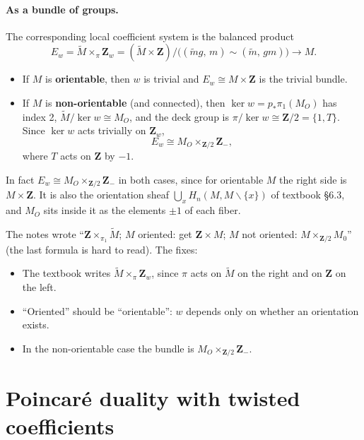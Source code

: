 \documentclass[11pt]{article}
\newcommand{\Z}{\mathbf{Z}}
\newcommand{\MO}{M_O}
\newcommand{\Mt}{\widetilde{M}}
\newcommand{\minus}{\smallsetminus}
\newcommand{\iso}{\cong}
\theoremstyle{namedit}
\theoremstyle{namedrm}
\begin{document}
\paragraph{As a bundle of groups.}
The corresponding local coefficient system is the balanced product
\[
  E_w=\Mt\times_{\pi}\Z_w=(\Mt\times\Z)\big/\bigl((\tilde m g,\,m)\sim(\tilde m,\,g m)\bigr)\longrightarrow M .
\]
\begin{itemize}
  \item If $M$ is \textbf{orientable}, then $w$ is trivial and $E_w\iso M\times\Z$ is the trivial bundle.
  \item If $M$ is \textbf{non-orientable} (and connected), then $\ker w=p_*\pi_1(\MO)$ has index 2,
        $\Mt/\ker w\iso\MO$, and the deck group is $\pi/\ker w\iso\Z/2=\{1,T\}$. Since $\ker w$ acts
        trivially on $\Z_w$,
        \[ E_w\iso\MO\times_{\Z/2}\Z_-, \]
        where $T$ acts on $\Z$ by $-1$.
\end{itemize}
In fact $E_w\iso\MO\times_{\Z/2}\Z_-$ in both cases, since for orientable $M$ the right side is
$M\times\Z$. It is also the orientation sheaf $\bigcup_{x}H_n(M,M\minus\{x\})$ of textbook \S6.3, and
$\MO$ sits inside it as the elements $\pm1$ of each fiber.

\begin{correction}[label=c:bundle]
The notes wrote ``$\Z\times_{\pi_1}\Mt$; $M$ oriented: get $\Z\times M$; $M$ not oriented:
$M\times_{\Z/2}M_0$'' (the last formula is hard to read). The fixes:
\begin{itemize}
  \item The textbook writes $\Mt\times_\pi\Z_w$, since $\pi$ acts on $\Mt$ on the right and on $\Z$ on
        the left.
  \item ``Oriented'' should be ``orientable'': $w$ depends only on whether an orientation exists.
  \item In the non-orientable case the bundle is $\MO\times_{\Z/2}\Z_-$.
\end{itemize}
\end{correction}

\section{Poincar\'e duality with twisted coefficients}
\end{document}
